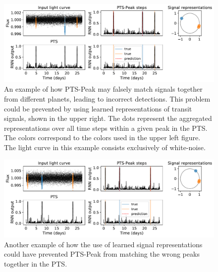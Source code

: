\begin{figure}
    \centering
    \includegraphics[width=0.85\linewidth]{Experiments/Figures/Cases/sf_multi_peak_repr_3.pdf}
    \caption{An example of how PTS-Peak may falsely match signals together from different planets, leading to incorrect detections. This problem could be prevented by using learned representations of transit signals, shown in the upper right. The dots represent the aggregated representations over all time steps within a given peak in the PTS. The colors correspond to the colors used in the upper left figure. The light curve in this example consists exclusively of white-noise.}
    \label{fig:sf_repr_3}
\end{figure}


\begin{figure}
    \centering
    \includegraphics[width=0.85\linewidth]{Experiments/Figures/Cases/sf_multi_peak_repr_2.pdf}
    \caption{Another example of how the use of learned signal representations could have prevented PTS-Peak from matching the wrong peaks together in the PTS.}
    \label{fig:sf_repr_2}
\end{figure}

